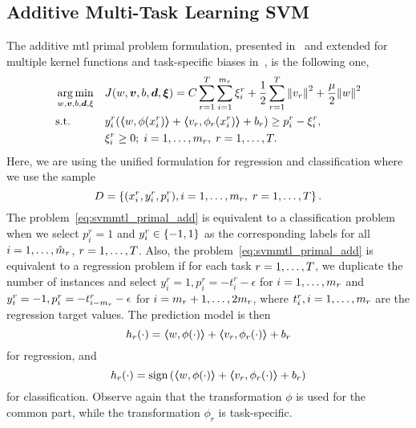 \subsection{Additive Multi-Task Learning SVM}
The {additive} \acrshort{mtl} primal problem formulation, presented in~\cite{EvgeniouP04} 
and extended for multiple kernel functions and task-specific biases in~\cite{CaiC12}, is the following one,
\begin{equation}\label{eq:svmmtl_primal_add}
    \begin{aligned}
    & \argmin_{w, \fv{v}, b, \fv{d}, \xi}
    & & {J({w}, \fv{v}, b, \fv{d}, \fv{\xi}) = C \sum_{r= 1}^T \sum_{i=1}^{m_r} {\xi_{i}^r} + \frac{1}{2} \sum_{r= 1}^T{\norm{{v}_r}^2} + \frac{\mu}{2} {\norm{{w}}}^2} \\
    & \text{s.t.}
    & & y_{i}^r (\dotp{w}{\phi(x_{i}^r)} + \dotp{v_r}{\phi_r(x_{i}^r)} + b_r) \geq p_{i}^r - \xi_{i}^r ,  \\
    & & & \xi_{i}^r \geq 0; \;  i=1 , \dotsc , m_r, \;  r= 1,\dotsc, T  . \\
    \end{aligned}
\end{equation}
Here, we are using the unified formulation for regression and classification where we use the sample 
$$D = \left\{(x_i^r, y_i^r, p_i^r), i=1, \ldots, {m}_r, \; r=1, \ldots, T\right\}. $$
The problem~\eqref{eq:svmmtl_primal_add} is equivalent to a classification problem when we select $p_i^r=1$ and $y_i^r \in \left\{-1, 1\right\}$ as the corresponding labels for all $i=1, \ldots, \hat{m}_r$, $r=1, \ldots, T$.
Also, the problem~\eqref{eq:svmmtl_primal_add} is equivalent to a regression problem if for each task $r=1, \ldots, T$, we duplicate the number of instances  and select $y_i^r=1, p_i^r=-t_{i}^r - \epsilon$ for $i=1, \ldots, m_r$ and $y_i^r=-1, p_i^r=-t_{i - m_r}^r - \epsilon$ for $i=m_r + 1, \ldots, 2m_r$, where $t_{i}^r, i=1, \ldots, m_r$ are the regression target values.
The prediction model is then 
\begin{equation}
    \nonumber
    h_r(\cdot) = \bm{\left\langle} w, \phi(\cdot) \bm{\right\rangle} + \bm{\left\langle} {v}_r, \phi_r(\cdot) \bm{\right\rangle} + b_r
\end{equation}
for regression, and 
\begin{equation}
    \nonumber
    h_r(\cdot) = \operatorname{sign}{ \left(\bm{\left\langle} w, \phi(\cdot) \bm{\right\rangle} + \bm{\left\langle} {v}_r, \phi_r(\cdot) \bm{\right\rangle} + b_r \right)}
\end{equation}
for classification.
Observe again that the transformation $\phi$ is used for the common part, while the transformation $\phi_r$ is task-specific.

